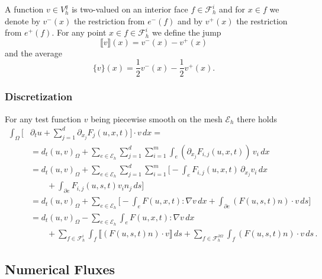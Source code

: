 \documentclass[a4paper,12pt]{article}
\theoremstyle{definition}
\theoremstyle{definition}
\newcommand{\Dim}{d}
\begin{document}
A function $v\in V_h^q$ is two-valued on an interior face $f\in\mathcal{F}_h^i$ and
for $x\in f$ we denote by $v^-(x)$ the restriction from $e^-(f)$ and by 
$v^+(x)$ the restriction from $e^+(f)$.
For any point $x\in f \in \mathcal{F}_h^i$ we define the jump
\begin{equation}
\llbracket v \rrbracket (x) = v^-(x)-v^+(x)
\end{equation}
and the average
\begin{equation}
\{ v \} (x) = \frac12 v^-(x) - \frac12 v^+(x) .
\end{equation}


\subsubsection*{Discretization}

For any test function $v$ being piecewise smooth
on the mesh $\mathcal{E}_h$ there holds
\begin{equation}\label{eq:DG_identity}
\begin{split}
\int_\Omega \biggl[&\partial_t u + \sum_{j=1}^{\Dim}\partial_{x_j}F_j(u,x,t)\biggr]\cdot v \,dx = \\
&= d_t (u,v)_\Omega + \sum_{e\in\mathcal{E}_h} \sum_{j=1}^{\Dim} \sum_{i=1}^m
\int_e (\partial_{x_j}F_{i,j}(u,x,t)) \, v_i \,dx \\
&= d_t (u,v)_\Omega + \sum_{e\in\mathcal{E}_h} \sum_{j=1}^{\Dim} \sum_{i=1}^m
\biggl[ - \int_e F_{i,j}(u,x,t) \,\partial_{x_j} v_i \,dx \\
&\qquad+ \int_{\partial e} F_{i,j}(u,s,t) v_i n_j\,ds \biggr]\\
&= d_t (u,v)_\Omega + \sum_{e\in\mathcal{E}_h}  \biggl[-\int_e F(u,x,t) : \nabla v\,dx
+ \int_{\partial e} (F(u,s,t)n)\cdot v\,ds\biggr]\\
&= d_t (u,v)_\Omega - \sum_{e\in\mathcal{E}_h} \int_e F(u,x,t) : \nabla v\,dx\\
&\qquad + \sum_{f\in\mathcal{F}_h^i} \int_f \llbracket (F(u,s,t)n)\cdot v \rrbracket \,ds
+ \sum_{f\in\mathcal{F}_h^{\partial\Omega}} \int_f (F(u,s,t)n)\cdot v \,ds \,.
\end{split}
\end{equation}

\subsection{Numerical Fluxes}
\end{document}
